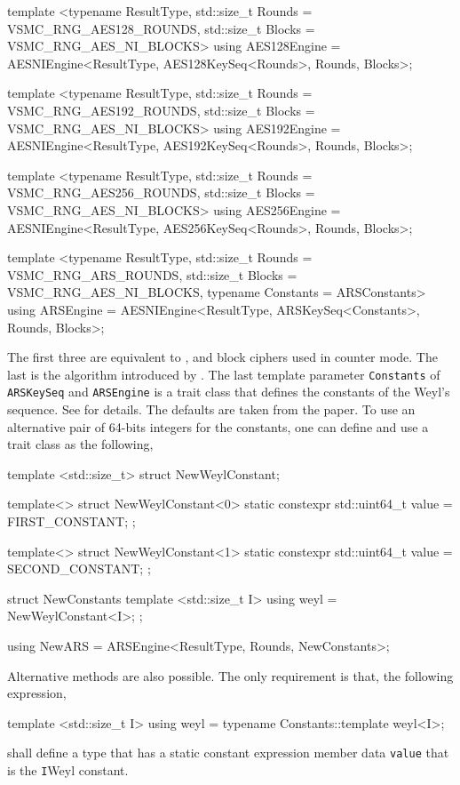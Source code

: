 \begin{cppcode}
  template <typename ResultType, std::size_t Rounds = VSMC_RNG_AES128_ROUNDS,
      std::size_t Blocks = VSMC_RNG_AES_NI_BLOCKS>
  using AES128Engine =
      AESNIEngine<ResultType, AES128KeySeq<Rounds>, Rounds, Blocks>;

  template <typename ResultType, std::size_t Rounds = VSMC_RNG_AES192_ROUNDS,
      std::size_t Blocks = VSMC_RNG_AES_NI_BLOCKS>
  using AES192Engine =
      AESNIEngine<ResultType, AES192KeySeq<Rounds>, Rounds, Blocks>;

  template <typename ResultType, std::size_t Rounds = VSMC_RNG_AES256_ROUNDS,
      std::size_t Blocks = VSMC_RNG_AES_NI_BLOCKS>
  using AES256Engine =
      AESNIEngine<ResultType, AES256KeySeq<Rounds>, Rounds, Blocks>;

  template <typename ResultType, std::size_t Rounds = VSMC_RNG_ARS_ROUNDS,
      std::size_t Blocks = VSMC_RNG_AES_NI_BLOCKS,
      typename Constants = ARSConstants>
  using ARSEngine =
      AESNIEngine<ResultType, ARSKeySeq<Constants>, Rounds, Blocks>;
\end{cppcode}
The first three are equivalent to ,  and  block ciphers
used in counter mode. The last is the \ars algorithm introduced by
\textcite{Salmon:2011um}. The last template parameter \verb|Constants| of
\verb|ARSKeySeq| and \verb|ARSEngine| is a trait class that defines the
constants of the Weyl's sequence. See \textcite{Salmon:2011um} for details. The
defaults are taken from the paper. To use an alternative pair of 64-bits
integers for the constants, one can define and use a trait class as the
following,
\begin{cppcode}
  template <std::size_t>
  struct NewWeylConstant;

  template<>
  struct NewWeylConstant<0>
  {
      static constexpr std::uint64_t value = FIRST_CONSTANT;
  };

  template<>
  struct NewWeylConstant<1>
  {
      static constexpr std::uint64_t value = SECOND_CONSTANT;
  };

  struct NewConstants
  {
      template <std::size_t I>
      using weyl = NewWeylConstant<I>;
  };

  using NewARS = ARSEngine<ResultType, Rounds, NewConstants>;
\end{cppcode}
Alternative methods are also possible. The only requirement is that, the
following expression,
\begin{cppcode}
  template <std::size_t I>
  using weyl = typename Constants::template weyl<I>;
\end{cppcode}
shall define a type that has a static constant expression member data
\verb|value| that is the \verb|I|\ith Weyl constant.

